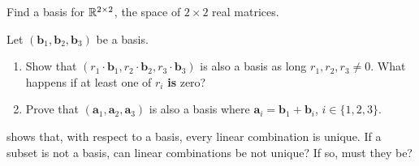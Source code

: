 \begin{exercise}{}{}
 Find a basis for $\mathbb{R}^{2 \times 2}$, the space of $2 \times 2$ real matrices.
\end{exercise}
\begin{exercise}{}{}
 Let $(\mathbf{b}_1,\mathbf{b}_2,\mathbf{b}_3)$ be a basis.
 \begin{enumerate}[label=(\alph*)]
  \item Show that $(r_1 \cdot \mathbf{b}_1, r_2 \cdot \mathbf{b}_2, r_3 \cdot
   \mathbf{b}_3)$ is also a basis as long $r_1,r_2,r_3 \neq 0$. What happens if
   at least one of $r_i$ \textbf{is} zero?
  \item Prove that $(\mathbf{a}_1,\mathbf{a}_2,\mathbf{a}_3)$ is also a basis
   where $\mathbf{a}_i = \mathbf{b}_1 + \mathbf{b}_i$, $i \in \{1,2,3\}$.
 \end{enumerate}
\end{exercise}
\begin{exercise}{}{}
  shows that, with respect to a
 basis, every linear combination is unique. If a subset is not a basis, can
 linear combinations be not unique? If so, must they be?
\end{exercise}

